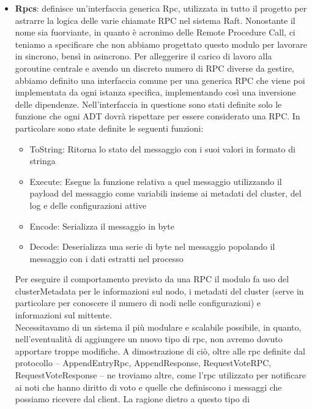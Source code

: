 \begin{itemize}
    \item \textbf{Rpcs}: 
        definisce un'interfaccia generica Rpc, utilizzata in tutto il progetto per astrarre la 
        logica delle varie chiamate RPC nel sistema Raft. Nonostante il nome sia fuorviante, 
        in quanto è acronimo delle Remote Procedure Call, ci teniamo a specificare che non abbiamo 
        progettato questo modulo per lavorare in sincrono, bensì in asincrono.
        Per alleggerire il carico di lavoro alla goroutine centrale e avendo un discreto numero di 
        RPC diverse da gestire, abbiamo definito una interfaccia comune per una generica RPC che 
        viene poi implementata da ogni istanza specifica, 
        implementando così una inversione delle dipendenze. 
        Nell'interfaccia in questione sono stati definite solo le funzione che ogni ADT dovrà 
        rispettare per essere considerato una RPC. In particolare sono state definite le seguenti 
        funzioni:
        \begin{itemize}
            \item ToString: Ritorna lo stato del messaggio con i suoi valori in formato di stringa
            \item Execute: Esegue la funzione relativa a quel messaggio utilizzando il payload 
                del messaggio come variabili insieme ai metadati del cluster, del log e 
                delle configurazioni attive
            \item Encode: Serializza il messaggio in byte
            \item Decode: Deserializza una serie di byte nel messaggio popolando il messaggio 
                con i dati estratti nel processo
        \end{itemize}
        Per eseguire il comportamento previsto da una RPC il modulo fa uso del clusterMetadata 
        per le informazioni sul nodo, i metadati del cluster (serve in particolare per conoscere 
        il numero di nodi nelle configurazioni) e informazioni sul mittente. \\
        Necessitavamo di un sistema il più modulare e scalabile possibile, in quanto,
        nell'eventualità di aggiungere un nuovo tipo di rpc, non avremo dovuto apportare troppe 
        modifiche. A dimostrazione di ciò, oltre alle rpc definite dal protocollo 
        -- AppendEntryRpc, AppendResponse, RequestVoteRPC, 
        RequestVoteResponse -- ne troviamo altre, come l'rpc utilizzato per notificare ai noti che hanno diritto di voto e quelle che definiscono i messaggi che possiamo ricevere dal client. La ragione dietro a questo tipo di 

\end{itemize}

